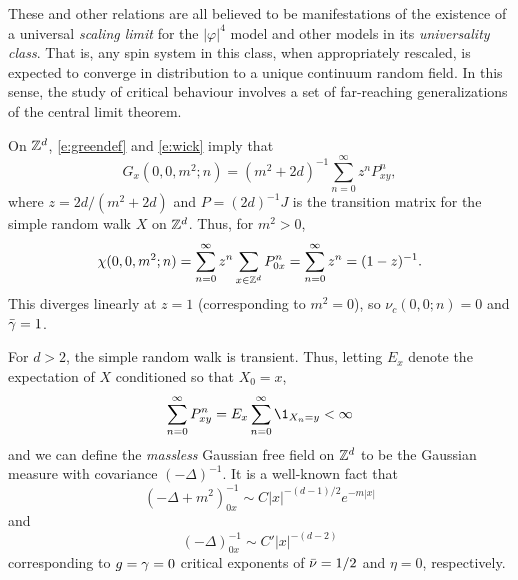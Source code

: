 These and other relations are all believed to be manifestations of the existence of
a universal \emph{scaling limit} for the $|\varphi|^4$ model and other models in its
\emph{universality class}. That is, any spin system in this class, when appropriately
rescaled, is expected to converge in distribution to a unique continuum random field.
In this sense, the study of critical behaviour involves a set of far-reaching
generalizations of the central limit theorem.

\begin{example}
\label{ex:gff-asymp}
On ${ {{\mathbb Z}}^d }$, \eqref{e:greendef} and \eqref{e:wick} imply that
\begin{equation}
G_x(0, 0, m^2; n)
	=
(m^2 + 2 d)^{-1} \sum_{n=0}^\infty z^n P^n_{xy},
\end{equation}
where $z = 2 d / (m^2 + 2 d)$ and $P = (2 d)^{-1} J$
is the transition matrix for the simple random walk $X$ on ${ {{\mathbb Z}}^d }$.
Thus, for $m^2 > 0$,
\begin{equation}
\chi(0, 0, m^2; n)
  =
\sum_{n=0}^\infty z^n \sum_{x\in{ {{\mathbb Z}}^d }} P^n_{0x}
  =
\sum_{n=0}^\infty z^n
  =
(1 - z)^{-1}.
\end{equation}
This diverges linearly at $z = 1$ (corresponding to $m^2 = 0$),
so $\nu_c(0, 0; n) = 0$ and $\bar\gamma = 1$.


For $d > 2$, the simple random walk is transient. Thus, letting $E_x$ denote the expectation
of $X$ conditioned so that $X_0 = x$,
\begin{equation}
\sum_{n=0}^\infty P^n_{xy} = E_x \sum_{n=0}^\infty \1_{X_n=y} < \infty
\end{equation}
and we can define the \emph{massless} Gaussian free field on ${ {{\mathbb Z}}^d }$ to be the Gaussian
measure with covariance $(-\Delta)^{-1}$. It is a well-known fact that
\begin{equation}
(-\Delta + m^2)^{-1}_{0x} \sim C |x|^{-(d-1)/2} e^{-m |x|}
\end{equation}
and
\begin{equation}
(-\Delta)^{-1}_{0x} \sim C' |x|^{-(d-2)}
\end{equation}
corresponding to $g = \gamma = 0$ critical exponents of $\bar\nu = 1/2$
and $\eta = 0$, respectively.
\end{example}

